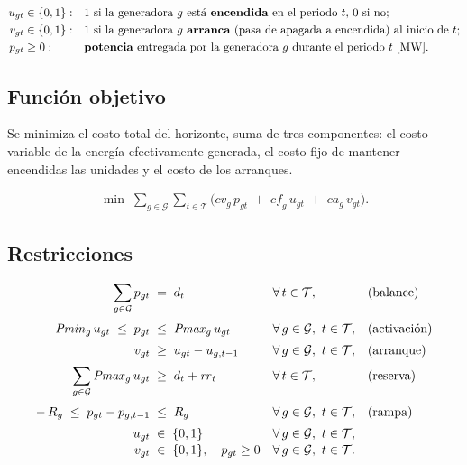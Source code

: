 \documentclass[11pt]{article}
\begin{document}
\begin{align*}
u_{gt} &\in \{0,1\}: & &\text{$1$ si la generadora $g$ está \textbf{encendida} en el periodo $t$, $0$ si no;} \\
v_{gt} &\in \{0,1\}: & &\text{$1$ si la generadora $g$ \textbf{arranca} (pasa de apagada a encendida) al inicio de $t$;} \\
p_{gt} &\ge 0: & &\text{\textbf{potencia} entregada por la generadora $g$ durante el periodo $t$ $[\text{MW}]$.}
\end{align*}

\subsection*{Función objetivo}

Se minimiza el costo total del horizonte, suma de tres componentes: el costo variable de la energía efectivamente generada, el costo fijo de mantener encendidas las unidades y el costo de los arranques.

\begin{align*}
\min \; \sum_{g\in\mathcal{G}}\sum_{t\in\mathcal{T}} \Big( \mathit{cv}_g\, p_{gt} \;+\; \mathit{cf}_g\, u_{gt} \;+\; \mathit{ca}_g\, v_{gt} \Big).
\end{align*}

\subsection*{Restricciones}

\begin{align}
\sum_{g\in\mathcal{G}} p_{gt} &\;=\; d_t
    & &\forall\, t\in\mathcal{T}, & &\text{(balance)} \\[2pt]
\mathit{Pmin}_g\, u_{gt} \;\le\; p_{gt} &\;\le\; \mathit{Pmax}_g\, u_{gt}
    & &\forall\, g\in\mathcal{G},\ t\in\mathcal{T}, & &\text{(activación)} \\[2pt]
v_{gt} &\;\ge\; u_{gt} - u_{g,t-1}
    & &\forall\, g\in\mathcal{G},\ t\in\mathcal{T}, & &\text{(arranque)} \\[2pt]
\sum_{g\in\mathcal{G}} \mathit{Pmax}_g\, u_{gt} &\;\ge\; d_t + \mathit{rr}_t
    & &\forall\, t\in\mathcal{T}, & &\text{(reserva)} \\[2pt]
-\,R_g \;\le\; p_{gt} - p_{g,t-1} &\;\le\; R_g
    & &\forall\, g\in\mathcal{G},\ t\in\mathcal{T}, & &\text{(rampa)} \\[2pt]
u_{gt} &\;\in\; \{0,1\}
    & &\forall\, g\in\mathcal{G},\ t\in\mathcal{T}, & & \notag \\[-2pt]
v_{gt} &\;\in\; \{0,1\},\quad p_{gt} \ge 0
    & &\forall\, g\in\mathcal{G},\ t\in\mathcal{T}. & & \notag
\end{align}
\end{document}

